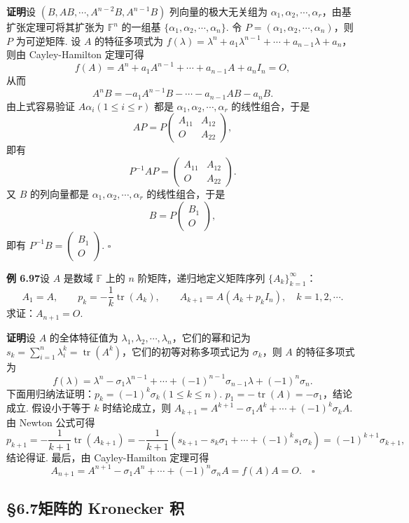 \documentclass[UTF8, 12pt, fontset=fandol, oneside]{ctexart}
\begin{document}
\noindent\textbf{证明}\quad 设 $(B,AB,\cdots,A^{n-2}B,A^{n-1}B)$ 列向量的极大无关组为 $\alpha_1,\alpha_2,\cdots,\alpha_r$，由基扩张定理可将其扩张为 $\mathbb{F}^n$ 的一组基 $\{\alpha_1,\alpha_2,\cdots,\alpha_n\}$. 令 $P=(\alpha_1,\alpha_2,\cdots,\alpha_n)$，则 $P$ 为可逆矩阵. 设 $A$ 的特征多项式为 $f(\lambda)=\lambda^n+a_1\lambda^{n-1}+\cdots+a_{n-1}\lambda+a_n$，则由 Cayley-Hamilton 定理可得
\[
f(A)=A^n+a_1A^{n-1}+\cdots+a_{n-1}A+a_nI_n=O,
\]
从而
\[
A^nB=-a_1A^{n-1}B-\cdots-a_{n-1}AB-a_nB.
\]
由上式容易验证 $A\alpha_i(1\le i\le r)$ 都是 $\alpha_1,\alpha_2,\cdots,\alpha_r$ 的线性组合，于是
\[
AP=P\begin{pmatrix} A_{11}&A_{12}\\ O&A_{22}\end{pmatrix},
\]
即有
\[
P^{-1}AP=\begin{pmatrix} A_{11}&A_{12}\\ O&A_{22}\end{pmatrix}.
\]
又 $B$ 的列向量都是 $\alpha_1,\alpha_2,\cdots,\alpha_r$ 的线性组合，于是
\[
B=P\begin{pmatrix} B_1\\ O\end{pmatrix},
\]
即有 $P^{-1}B=\begin{pmatrix} B_1\\ O\end{pmatrix}$. $\square$

\noindent\textbf{例 6.97}\quad 设 $A$ 是数域 $\mathbb{F}$ 上的 $n$ 阶矩阵，递归地定义矩阵序列 $\{A_k\}_{k=1}^{\infty}$：
\[
A_1=A,\qquad p_k=-\frac{1}{k}\operatorname{tr}(A_k),\qquad A_{k+1}=A(A_k+p_kI_n),\quad k=1,2,\cdots.
\]
求证：$A_{n+1}=O$.

\noindent\textbf{证明}\quad 设 $A$ 的全体特征值为 $\lambda_1,\lambda_2,\cdots,\lambda_n$，它们的幂和记为 $s_k=\sum_{i=1}^n\lambda_i^k=\operatorname{tr}(A^k)$，它们的初等对称多项式记为 $\sigma_k$，则 $A$ 的特征多项式为
\[
f(\lambda)=\lambda^n-\sigma_1\lambda^{n-1}+\cdots+(-1)^{n-1}\sigma_{n-1}\lambda+(-1)^n\sigma_n.
\]
下面用归纳法证明：$p_k=(-1)^k\sigma_k(1\le k\le n)$. $p_1=-\operatorname{tr}(A)=-\sigma_1$，结论成立. 假设小于等于 $k$ 时结论成立，则 $A_{k+1}=A^{k+1}-\sigma_1A^k+\cdots+(-1)^k\sigma_kA$. 由 Newton 公式可得
\[
p_{k+1}=-\frac{1}{k+1}\operatorname{tr}(A_{k+1})
=-\frac{1}{k+1}(s_{k+1}-s_k\sigma_1+\cdots+(-1)^ks_1\sigma_k)
=(-1)^{k+1}\sigma_{k+1},
\]
结论得证. 最后，由 Cayley-Hamilton 定理可得
\[
A_{n+1}=A^{n+1}-\sigma_1A^n+\cdots+(-1)^n\sigma_nA=f(A)A=O. \quad \square
\]

\subsection*{§6.7\quad 矩阵的 Kronecker 积}
\end{document}
